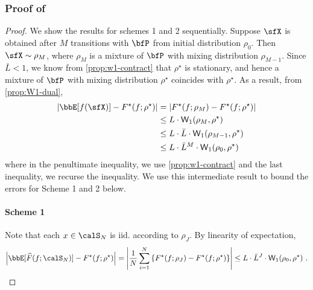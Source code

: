\documentclass[11pt]{article}
\newcounter{ct}
\begin{document}
\subsubsection{Proof of }
\label{sec:prf:conv-error-bound}

\begin{proof}
We show the results for schemes 1 and 2 sequentially.
Suppose \(\sfX\) is obtained after \(M\) transitions with \(\bfP\) from initial distribution \(\rho_{0}\).
Then \(\sfX \sim \rho_{M}\), where \(\rho_{M}\) is a mixture of \(\bfP\) with mixing distribution \(\rho_{M - 1}\).
Since \(\bar{L} < 1\), we know from \cref{prop:w1-contract} that \(\rho^{\star}\) is stationary, and hence a mixture of \(\bfP\) with mixing distribution \(\rho^{\star}\) coincides with \(\rho^{\star}\).
As a result, from \cref{prop:W1-dual},
\begin{align*}
    \left|\bbE[f(\sfX)] - F^{\star}(f; \rho^{\star})\right| &= \left|F^{\star}(f; \rho_{M}) - F^{\star}(f; \rho^{\star})\right| \\
    &\leq L \cdot \mathsf{W}_{1}(\rho_{M}, \rho^{\star}) \\
    &\leq L \cdot \bar{L} \cdot \mathsf{W}_{1}(\rho_{M - 1}, \rho^{\star}) \\
    &\leq L \cdot \bar{L}^{M} \cdot \mathsf{W}_{1}(\rho_{0}, \rho^{\star})
\end{align*}
where in the penultimate inequality, we use \cref{prop:w1-contract} and the last inequality, we recurse the inequality.
We use this intermediate result to bound the errors for Scheme 1 and 2 below.

\paragraph{Scheme 1}
Note that each \(x \in \calS_{N}\) is iid. according to \(\rho_{J}\).
By linearity of expectation,
\begin{equation*}
    \left|\bbE[\widehat{F}(f; \calS_{N})] - F^{\star}(f; \rho^{\star})\right| = \left|\frac{1}{N}\sum_{i=1}^{N}\left\{F^{\star}(f; \rho_{J}) - F^{\star}(f; \rho^{\star})\right\}\right| \leq L \cdot \bar{L}^{J} \cdot \mathsf{W}_{1}(\rho_{0}, \rho^{\star})~.
\end{equation*}


\end{proof}
\end{document}
